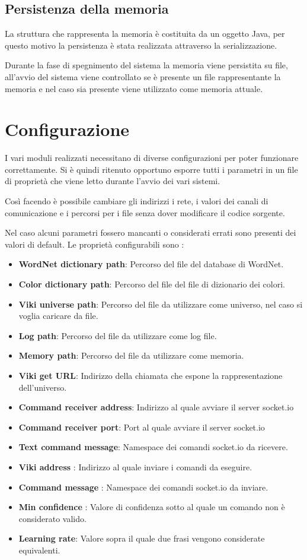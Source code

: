 \documentclass[twoside]{supsistudent}
\begin{document}
\section{Persistenza della memoria}
La struttura che rappresenta la memoria è costituita da un oggetto Java, per questo motivo la persistenza è stata realizzata attraverso la serializzazione.

Durante la fase di spegnimento del sistema la memoria viene persistita su file, all'avvio del sistema viene controllato se è presente un file rappresentante la memoria e nel caso sia presente viene utilizzato come memoria attuale.

\chapter{Configurazione}
I vari moduli realizzati necessitano di diverse configurazioni per poter funzionare correttamente. Si è quindi ritenuto opportuno esporre tutti i parametri in un file di proprietà che viene letto durante l'avvio dei vari sistemi. 

Così facendo è possibile cambiare gli indirizzi i rete, i valori dei canali di comunicazione e i percorsi per i file senza dover modificare il codice sorgente.

Nel caso alcuni parametri fossero mancanti o considerati errati sono presenti dei valori di default.
Le proprietà configurabili sono :
\begin{itemize}

  \item \textbf{WordNet dictionary path}: Percorso del file del database di WordNet.
   \item \textbf{Color dictionary path}: Percorso del file del file di dizionario dei colori.
      \item \textbf{Viki universe path}: Percorso del file da utilizzare come universo, nel caso si voglia caricare da file.
      \item \textbf{Log path}: Percorso del file da utilizzare come log file.
      \item \textbf{Memory path}: Percorso del file da utilizzare come memoria.
      \item \textbf{Viki get URL}: Indirizzo della chiamata che espone la rappresentazione dell'universo.
      \item \textbf{Command receiver address}: Indirizzo al quale avviare il server socket.io
      \item \textbf{Command receiver port}: Port al quale avviare il server socket.io
      \item \textbf{Text command message}: Namespace dei comandi socket.io da ricevere.
      \item \textbf{Viki address }: Indirizzo al quale inviare i comandi da eseguire.
      \item \textbf{Command message }: Namespace dei comandi socket.io da inviare.
      \item \textbf{Min confidence }: Valore di confidenza sotto al quale un comando non è considerato valido.
      \item \textbf{Learning rate}: Valore sopra il quale due frasi vengono considerate equivalenti.
\end{itemize}
\end{document}
